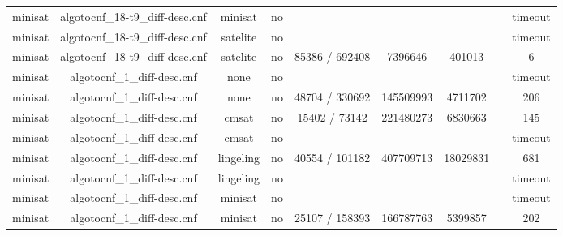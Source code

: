 \begin{appendices}
\begin{table}[p]
\begin{center}
\begin{tabular}{l|cccccccc}
  minisat                        & algotocnf\_18-t9\_diff-desc.cnf & minisat    & no    &            &           &           &            & timeout \\ %
  minisat                        & algotocnf\_18-t9\_diff-desc.cnf & satelite   & no    &            &           &           &            & timeout \\ %
  minisat                        & algotocnf\_18-t9\_diff-desc.cnf & satelite   & no    & 85386 / 692408 & 7396646   & 401013    &            & 6 \\ %
  minisat                        & algotocnf\_1\_diff-desc.cnf    & none       & no    &            &           &           &            & timeout \\ %
  minisat                        & algotocnf\_1\_diff-desc.cnf    & none       & no    & 48704 / 330692 & 145509993 & 4711702   &            & 206 \\ %
  minisat                        & algotocnf\_1\_diff-desc.cnf    & cmsat      & no    & 15402 / 73142 & 221480273 & 6830663   &            & 145 \\ %
  minisat                        & algotocnf\_1\_diff-desc.cnf    & cmsat      & no    &            &           &           &            & timeout \\ %
  minisat                        & algotocnf\_1\_diff-desc.cnf    & lingeling  & no    & 40554 / 101182 & 407709713 & 18029831  &            & 681 \\ %
  minisat                        & algotocnf\_1\_diff-desc.cnf    & lingeling  & no    &            &           &           &            & timeout \\ %
  minisat                        & algotocnf\_1\_diff-desc.cnf    & minisat    & no    &            &           &           &            & timeout \\ %
  minisat                        & algotocnf\_1\_diff-desc.cnf    & minisat    & no    & 25107 / 158393 & 166787763 & 5399857   &            & 202 \\ %

\end{tabular}
\end{center}
\end{table}
\end{appendices}
